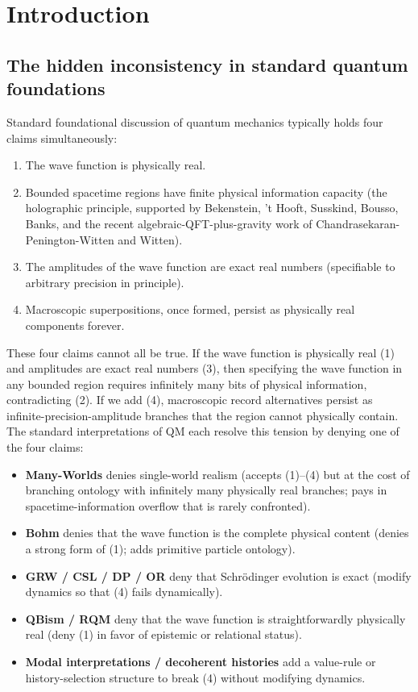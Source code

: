 \documentclass[11pt,a4paper]{article}
\begin{document}
\tableofcontents
\newpage


\section{Introduction}

\subsection{The hidden inconsistency in standard quantum foundations}

Standard foundational discussion of quantum mechanics typically holds four claims simultaneously:

\begin{enumerate}
  \item The wave function is physically real.
  \item Bounded spacetime regions have finite physical information capacity (the holographic principle, supported by Bekenstein, 't Hooft, Susskind, Bousso, Banks, and the recent algebraic-QFT-plus-gravity work of Chandrasekaran-Penington-Witten and Witten).
  \item The amplitudes of the wave function are exact real numbers (specifiable to arbitrary precision in principle).
  \item Macroscopic superpositions, once formed, persist as physically real components forever.
\end{enumerate}

These four claims cannot all be true. If the wave function is physically real (1) and amplitudes are exact real numbers (3), then specifying the wave function in any bounded region requires infinitely many bits of physical information, contradicting (2). If we add (4), macroscopic record alternatives persist as infinite-precision-amplitude branches that the region cannot physically contain. The standard interpretations of QM each resolve this tension by denying one of the four claims:

\begin{itemize}
  \item \textbf{Many-Worlds} denies single-world realism (accepts (1)–(4) but at the cost of branching ontology with infinitely many physically real branches; pays in spacetime-information overflow that is rarely confronted).
  \item \textbf{Bohm} denies that the wave function is the complete physical content (denies a strong form of (1); adds primitive particle ontology).
  \item \textbf{GRW / CSL / DP / OR} deny that Schrödinger evolution is exact (modify dynamics so that (4) fails dynamically).
  \item \textbf{QBism / RQM} deny that the wave function is straightforwardly physically real (deny (1) in favor of epistemic or relational status).
  \item \textbf{Modal interpretations / decoherent histories} add a value-rule or history-selection structure to break (4) without modifying dynamics.
\end{itemize}
\end{document}
